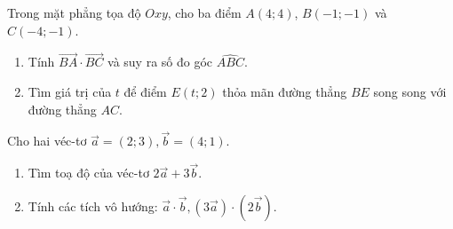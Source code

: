\begin{bt}%
Trong mặt phẳng tọa độ $Oxy$, cho ba điểm $A(4;4)$, $B(-1;-1)$ và $C(-4;-1)$.
\begin{enumerate}
\item Tính $\overrightarrow{BA} \cdot \overrightarrow{BC}$ và suy ra số đo góc $\widehat{ABC}$.
\item Tìm giá trị của $t$ để điểm $E(t;2)$ thỏa mãn đường thẳng $BE$ song song với đường thẳng $AC$.
\end{enumerate}
\end{bt}

\begin{bt}%
	Cho hai véc-tơ $\overrightarrow{a}=(2;3),\overrightarrow{b}=(4;1)$.
	\begin{enumerate}
		\item Tìm toạ độ của véc-tơ $2\overrightarrow{a}+3\overrightarrow{b}$.
		\item Tính các tích vô hướng: $\overrightarrow{a} \cdot \overrightarrow{b},(3\overrightarrow{a}) \cdot (2\overrightarrow{b})$.
	\end{enumerate}
\end{bt}

